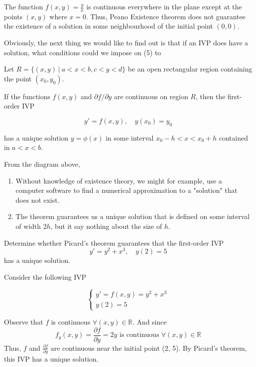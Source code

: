 \begin{remark}
    The function $f(x,y) = \frac{y}{x}$ is continuous everywhere in the plane except
    at the points $(x, y)$ where $x=0$. Thus, Peano Existence theorem does not guarantee 
    the existence of a solution in some neighbourhood of the initial point $(0,0)$.
\end{remark}

Obviously, the next thing we would like to find out is that if an IVP does have a solution, what conditions 
could we impose on (5) to 

\begin{theorem}
    Let $R = \{(x,y) \> | \> a < x < b, c < y < d\}$ be an open rectangular region 
    containing the point $(x_0, y_0)$.

    

    If the functions $f(x,y)$ and $\partial f / \partial y$ are continuous on region $R$, then the first-order IVP

    \begin{equation}
        y' = f(x,y), \quad y(x_0) = y_0
    \end{equation}

    has a unique solution $y = \phi(x)$ in some interval $x_0 - h < x < x_0 + h$ contained in $a < x < b$.
\end{theorem}

\begin{remark}
    From the diagram above,

    \begin{enumerate}
        \item Without knowledge of existence theory, we might for example, use a computer software to find a numerical 
            approximation to a "solution" that does not exist.
        \item The theorem guarantees us a unique solution that is defined on some interval of width $2h$, but it say nothing about 
            the size of $h$.
    \end{enumerate}
\end{remark}

\begin{example}
    Determine whether Picard's theorem guarantees that the first-order IVP
    \[
        y' = y^2 + x^3, \quad y(2) = 5
    \]
    has a unique solution.
\end{example}
\begin{solution}
    Consider the following IVP

    \[
        \begin{cases}
            y' = f(x,y) = y^2 + x^3\\
            y(2) = 5
        \end{cases}
    \]

    Observe that $f$ is continuous $\forall (x,y) \in \mathbb{R}$. And since
    \[
        f_y(x, y) = \frac{\partial f}{\partial y}=2y \text{ is continuous } \forall (x,y) \in \mathbb{R}
    \]
    Thus, $f$ and $\frac{\partial f}{\partial y}$ are continuous near the initial point (2, 5). 
    By Picard's theorem, this IVP has a unique solution.
\end{solution}

